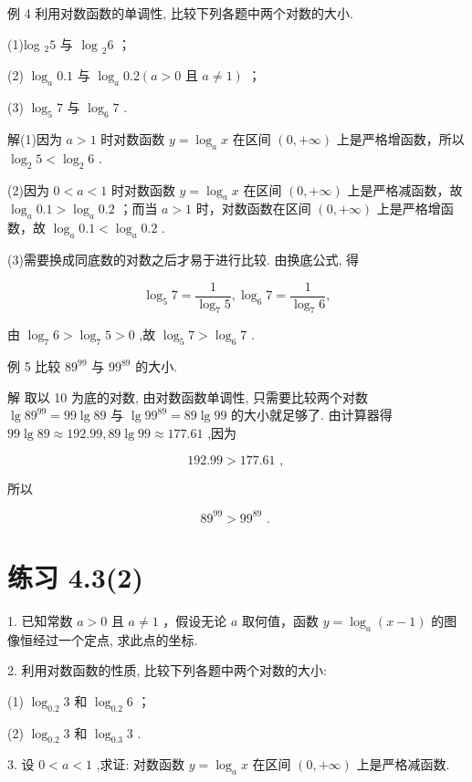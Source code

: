\documentclass[10pt]{article}
\begin{document}
例 4 利用对数函数的单调性, 比较下列各题中两个对数的大小.

(1)log \({}_{2}5\) 与 \({\text{ log }}_{2}6\) ；

(2) \({\log }_{a}{0.1}\) 与 \({\log }_{a}{0.2}\left( {a > 0\text{ 且 }a \neq  1}\right)\) ；

(3) \({\log }_{5}7\) 与 \({\log }_{6}7\) .

解(1)因为 \(a > 1\) 时对数函数 \(y = {\log }_{a}x\) 在区间 \(\left( {0, + \infty }\right)\) 上是严格增函数，所以 \({\log }_{2}5 < {\log }_{2}6\) .

(2)因为 \(0 < a < 1\) 时对数函数 \(y = {\log }_{a}x\) 在区间 \(\left( {0, + \infty }\right)\) 上是严格减函数，故 \({\log }_{a}{0.1} > {\log }_{a}{0.2}\) ；而当 \(a > 1\) 时，对数函数在区间 \(\left( {0, + \infty }\right)\) 上是严格增函数，故 \({\log }_{a}{0.1} < {\log }_{a}{0.2}\) .

(3)需要换成同底数的对数之后才易于进行比较. 由换底公式, 得

\[
{\log }_{5}7 = \frac{1}{{\log }_{7}5},{\log }_{6}7 = \frac{1}{{\log }_{7}6},
\]

由 \({\log }_{7}6 > {\log }_{7}5 > 0\) ,故 \({\log }_{5}7 > {\log }_{6}7\) .

例 5 比较 \({89}^{99}\) 与 \({99}^{89}\) 的大小.

解 取以 10 为底的对数, 由对数函数单调性, 只需要比较两个对数 \(\lg {89}^{99} = {99}\lg {89}\) 与 \(\lg {99}^{89} = {89}\lg {99}\) 的大小就足够了. 由计算器得 \({99}\lg {89} \approx  {192.99},{89}\lg {99} \approx  {177.61}\) ,因为

\[
{192.99} > {177.61}\text{ , }
\]

所以

\[
{89}^{99} > {99}^{89}\text{ . }
\]

\section*{练习 4.3(2)}

1. 已知常数 \(a > 0\) 且 \(a \neq  1\) ，假设无论 \(a\) 取何值，函数 \(y = {\log }_{a}\left( {x - 1}\right)\) 的图像恒经过一个定点, 求此点的坐标.

2. 利用对数函数的性质, 比较下列各题中两个对数的大小:

(1) \({\log }_{0.2}3\) 和 \({\log }_{0.2}6\) ；

(2) \({\log }_{0.2}3\) 和 \({\log }_{0.3}3\) .

3. 设 \(0 < a < 1\) ,求证: 对数函数 \(y = {\log }_{a}x\) 在区间 \(\left( {0, + \infty }\right)\) 上是严格减函数.
\end{document}
